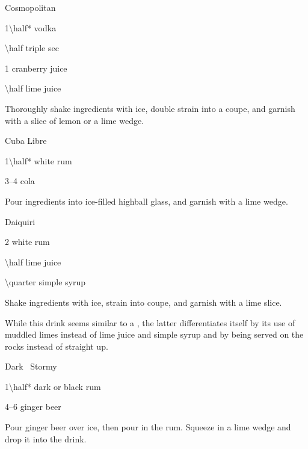 \begin{Cocktail}{Cosmopolitan}
	\begin{Ingredients}
	\item \SI{1\half*}{\oz} vodka
	\item \SI{\half}{\oz} triple sec
	\item \SI{1}{\oz} cranberry juice
	\item \SI{\half}{\oz} lime juice
	\end{Ingredients}
	
	\begin{Instructions}
	Thoroughly shake ingredients with ice,  double strain into a coupe, and garnish with a slice of lemon or a lime wedge.
	\end{Instructions}
\end{Cocktail}

\begin{Cocktail}{Cuba Libre}
	\begin{Ingredients}
	\item \SI{1\half*}{\oz} white rum
	\item \SIrange{3}{4}{\oz} cola
	\end{Ingredients}
	
	\begin{Instructions}
	Pour ingredients into ice-filled highball glass, and garnish with a lime wedge.
	\end{Instructions}
\end{Cocktail}

\begin{Cocktail}{Daiquiri}
	\begin{Ingredients}
	\item \SI{2}{\oz} white rum
	\item \SI{\half}{\oz} lime juice
	\item \SI{\quarter}{\oz} simple syrup
	\end{Ingredients}
	
	\begin{Instructions}
	Shake ingredients with ice, strain into coupe, and garnish with a lime slice.
	
	While this drink seems similar to a , the latter differentiates itself by its use of muddled limes instead of lime juice and simple syrup and by being served on the rocks instead of straight up. 
	\end{Instructions}
\end{Cocktail}

\begin{Cocktail}{Dark \And\ Stormy}
	\begin{Ingredients}
	\item \SI{1\half*}{\oz} dark or black rum
	\item \SIrange{4}{6}{\oz} ginger beer
	\end{Ingredients}
	
	\begin{Instructions}
	Pour ginger beer over ice, then pour in the rum.  Squeeze in a lime wedge and drop it into the drink.
	\end{Instructions}
\end{Cocktail}

